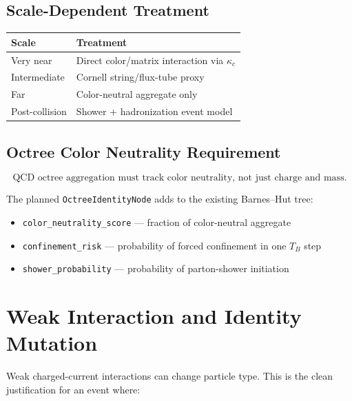 \documentclass[11pt,a4paper]{article}
\theoremstyle{defbox}
\begin{document}
\subsection{Scale-Dependent Treatment}

\begin{center}
\renewcommand{\arraystretch}{1.25}
\begin{tabular}{ll}
\toprule
\textbf{Scale} & \textbf{Treatment} \\
\midrule
Very near       & Direct color/matrix interaction via $\kappa_c$ \\
Intermediate    & Cornell string/flux-tube proxy \\
Far             & Color-neutral aggregate only \\
Post-collision  & Shower + hadronization event model \\
\bottomrule
\end{tabular}
\end{center}

\subsection{Octree Color Neutrality Requirement}

\begin{equation}
  \boxed{
	\text{QCD octree aggregation must track color neutrality,
		  not just charge and mass.}
  }
\end{equation}

The planned \texttt{OctreeIdentityNode} adds to the existing Barnes--Hut
tree:
\begin{itemize}
  \item \texttt{color\_neutrality\_score} --- fraction of color-neutral aggregate
  \item \texttt{confinement\_risk} --- probability of forced confinement in
		one $T_B$ step
  \item \texttt{shower\_probability} --- probability of parton-shower initiation
\end{itemize}

\section{Weak Interaction and Identity Mutation}
\label{sec:weak}

Weak charged-current interactions can change particle type.  This is the
clean justification for an event where:
\end{document}
